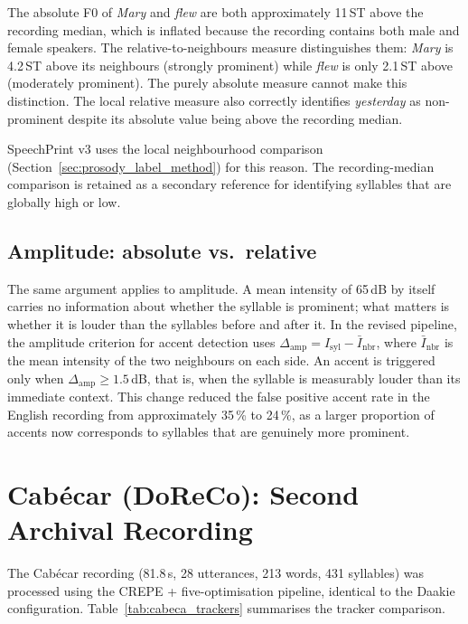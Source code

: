 The absolute F0 of \textit{Mary} and \textit{flew} are both approximately 11\,ST
above the recording median, which is inflated because the recording contains both
male and female speakers. The relative-to-neighbours measure distinguishes them:
\textit{Mary} is 4.2\,ST above its neighbours (strongly prominent) while
\textit{flew} is only 2.1\,ST above (moderately prominent). The purely absolute
measure cannot make this distinction. The local relative measure also correctly
identifies \textit{yesterday} as non-prominent despite its absolute value being
above the recording median.

SpeechPrint v3 uses the local neighbourhood comparison (Section~\ref{sec:prosody_label_method})
for this reason. The recording-median comparison is retained as a secondary
reference for identifying syllables that are globally high or low.

\subsection{Amplitude: absolute vs.\ relative}

The same argument applies to amplitude. A mean intensity of 65\,dB by itself
carries no information about whether the syllable is prominent; what matters is
whether it is louder than the syllables before and after it. In the revised
pipeline, the amplitude criterion for accent detection uses
$\Delta_{\mathrm{amp}} = I_{\mathrm{syl}} - \bar{I}_{\mathrm{nbr}}$, where
$\bar{I}_{\mathrm{nbr}}$ is the mean intensity of the two neighbours on each side.
An accent is triggered only when $\Delta_{\mathrm{amp}} \geq 1.5$\,dB, that is,
when the syllable is measurably louder than its immediate context. This change
reduced the false positive accent rate in the English recording from approximately
35\,\% to 24\,\%, as a larger proportion of accents now corresponds to syllables
that are genuinely more prominent.

\section{Cabécar (DoReCo): Second Archival Recording}
\label{sec:cabeca_results}

The Cabécar recording (81.8\,s, 28 utterances, 213 words, 431 syllables) was
processed using the CREPE + five-optimisation pipeline, identical to the Daakie
configuration. Table~\ref{tab:cabeca_trackers} summarises the tracker comparison.

